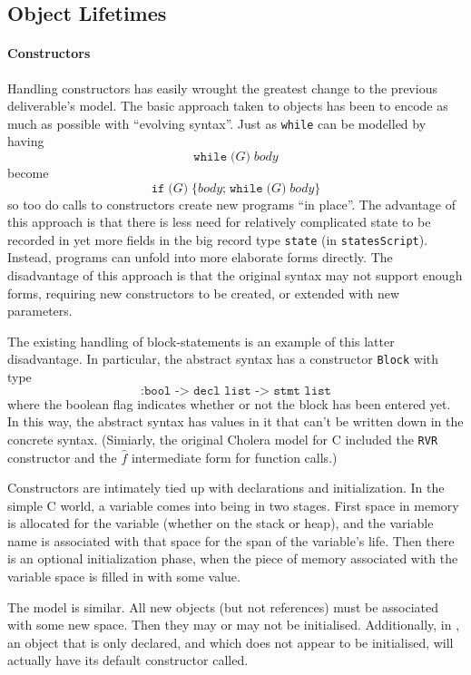 \documentclass[11pt]{article}
\begin{document}
\subsection{Object Lifetimes}
\label{sec:object-lifetimes}

\paragraph{Constructors}
Handling constructors has easily wrought the greatest change to the
previous deliverable's model.  The basic approach taken to objects has
been to encode as much as possible with ``evolving syntax''.  Just as
\texttt{while} can be modelled by having
\[
\texttt{while}\;\texttt{(}G\texttt{)}\;\mathit{body}
\] become \[
\texttt{if}\;\texttt{(}G\texttt{)}\;\texttt{\{}\mathit{body}\texttt{;}\;\texttt{while}\;\texttt{(}G\texttt{)}\;\mathit{body} \texttt{\}}
\]
so too do calls to \cpp{} constructors create new programs ``in
place''.  The advantage of this approach is that there is less need
for relatively complicated state to be recorded in yet more fields in
the big record type \texttt{state} (in \texttt{statesScript}).
Instead, programs can unfold into more elaborate forms directly.  The
disadvantage of this approach is that the original syntax may not
support enough forms, requiring new constructors to be created, or
extended with new parameters.

The existing handling of block-statements is an example of this latter
disadvantage.  In particular, the abstract syntax has a constructor
\texttt{Block} with type
\[
\texttt{:bool -> decl list -> stmt list}
\]
where the boolean flag indicates whether or not the block has been
entered yet.  In this way, the abstract syntax has values in it that
can't be written down in the concrete syntax.  (Simiarly, the original
\textsf{Cholera} model for C included the \texttt{RVR} constructor and
the $\hat{f}$ intermediate form for function calls.)

Constructors are intimately tied up with declarations and
initialization.  In the simple C world, a variable comes into being in
two stages.  First space in memory is allocated for the variable
(whether on the stack or heap), and the variable name is associated
with that space for the span of the variable's life.  Then there is an
optional initialization phase, when the piece of memory associated
with the variable space is filled in with some value.

The \cpp{} model is similar.  All new objects (but not references)
must be associated with some new space.  Then they may or may not be
initialised.  Additionally, in \cpp{}, an object that is only
declared, and which does not appear to be initialised, will actually
have its default constructor called.
\end{document}
